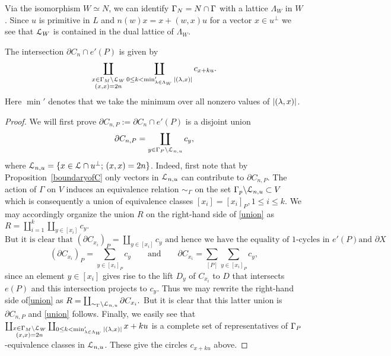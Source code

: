 Via the isomorphism $W \simeq N$, we can identify $\Gamma_N = N \cap \Gamma$ with a lattice $\Lambda_W$ in $W$. Since  $u$ is primitive in $L $ and $n(w) x= x + (w,x)u$ for a vector $x \in u^{\perp}$ we see that ${\mathcal{L}}_W$ is contained in the dual lattice of $\Lambda_W$. 

\begin{lemma}\label{LemmaB}
The intersection $\partial C_n \cap e'(P)$ is given by 
\[
 \coprod_{ \substack{x\in \Gamma_M \backslash \mathcal{L}_W \\ (x,x)=2n}} \coprod_{0 \leq k < \min'_{\lambda \in \Lambda_W}   |(\lambda,x)|} c_{x+ku}.
 \] 
Here $\min'$ denotes that we take the minimum over all nonzero values of $ |(\lambda,x)|$.
\end{lemma}

\begin{proof}

We will first prove $\partial C_{n,P} := \partial C_n \cap e'(P)$ is a disjoint union
\begin{equation} \label{union}
\partial C_{n,P} = \coprod_{y \in \Gamma_P \backslash \mathcal{L}_{n,u}} c_y,
\end{equation}
where $\mathcal{L}_{n,u} = \{ x \in \mathcal{L} \cap u^{\perp};\, (x,x)=2n\}$. Indeed, first note that by Proposition~\ref{boundaryofC} only vectors in $\mathcal{L}_{n,u}$ can contribute to $\partial C_{n,P}$. 
The action of $\Gamma$ on $V$ induces an equivalence relation $\sim_{\Gamma}$ on the set $\Gamma_p \backslash \mathcal{L}_{n,u} \subset V$ which is consequently a
union of equivalence classes $[x_i]= [x_i]_P, 1 \leq i \leq k$.  We may accordingly organize the union $R$ on the right-hand side of \eqref{union} as $R =  \coprod _{i=1}^k  \coprod_{ y \in [x_i]} c_y.$\\
$\text{But it is clear that $(\partial C_{x_i})_P = \coprod_{ y \in [x_i]} c_y$ and hence we have the equality of $1$-cycles in $e'(P)$
and $\partial X$}$
\begin{equation}\label{boundaryofspecialcycle}
(\partial C_{x_i})_P = \sum_{ y \in [x_i]_P} c_y \qquad  \text{and} \qquad  \partial C_{x_i}= \sum_{[P]} \sum_{ y \in [x_i]_P} c_y,
\end{equation}
since an element $y  \in [x_i]$ gives rise to the lift $D_y$ of $C_{x_i}$ to $D$ that intersects
$e(P)$ and this intersection projects to $c_y$.  Thus we may rewrite the right-hand side of\eqref{union} as
$R= \coprod_{  \sim_{\Gamma} \backslash \mathcal{L}_{n,u}} \partial C_{x_i}.$
But it is clear that this latter union is $\partial C_{n,P}$ and \eqref{union} follows. Finally, we easily see that $\coprod_{ \substack{x\in \Gamma_M \backslash \mathcal{L}_W \\ (x,x)=2n}} \coprod_{0 \leq k < \min'_{\lambda \in \Lambda_W}   |(\lambda,x)|} x+ku$ is a complete set of representatives of $\Gamma_P$-equivalence classes in $\mathcal{L}_{n,u}$. These give the circles $c_{x+ku}$ above. 

\end{proof}



